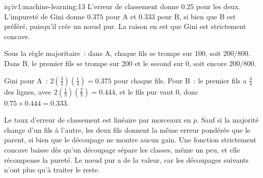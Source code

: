 \begin{solution}{iq:iv1:machine-learning:13}
L'erreur de classement donne $0.25$ pour les deux. L'impureté de Gini donne $0.375$ pour A et $0.333$ pour B, si bien que B est préféré, puisqu'il crée un nœud pur. La raison en est que Gini est strictement concave.

Sous la règle majoritaire~: dans A, chaque fils se trompe sur 100, soit $200/800$. Dans B, le premier fils se trompe sur 200 et le second sur 0, soit encore $200/800$.

Gini pour A~: $2(\frac34)(\frac14) = 0.375$ pour chaque fils. Pour B~: le premier fils a $\frac34$ des lignes, avec $2(\frac13)(\frac23) = 0.444$, et le fils pur vaut 0, donc $0.75 \times 0.444 = 0.333$.

Le taux d'erreur de classement est linéaire par morceaux en $p$. Sauf si la majorité change d'un fils à l'autre, les deux fils donnent la même erreur pondérée que le parent, si bien que le découpage ne montre aucun gain. Une fonction strictement concave baisse dès qu'un découpage sépare les classes, même un peu, et elle récompense la pureté. Le nœud pur a de la valeur, car les découpages suivants n'ont plus qu'à traiter le reste.



\end{solution}

